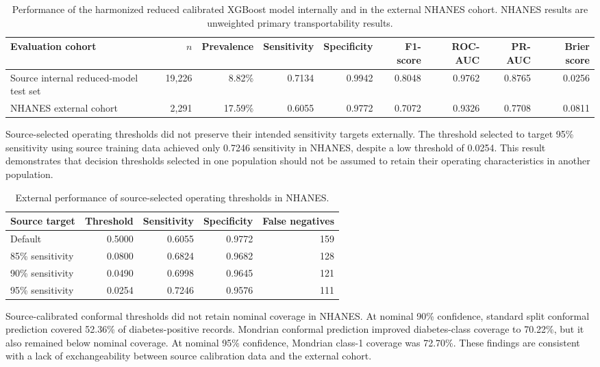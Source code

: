 \documentclass{ieeeaccess}
\begin{document}
\begin{table}[t]
\caption{Performance of the harmonized reduced calibrated XGBoost model internally and in the external NHANES cohort. NHANES results are unweighted primary transportability results.}
\label{tab:externalperformance}
\centering
\begin{tabular}{lrrrrrrrr}
\toprule
Evaluation cohort & $n$ & Prevalence & Sensitivity & Specificity & F1-score & ROC-AUC & PR-AUC & Brier score \\
\midrule
Source internal reduced-model test set & 19,226 & 8.82\% & 0.7134 & 0.9942 & 0.8048 & 0.9762 & 0.8765 & 0.0256 \\
NHANES external cohort & 2,291 & 17.59\% & 0.6055 & 0.9772 & 0.7072 & 0.9326 & 0.7708 & 0.0811 \\
\bottomrule
\end{tabular}
\end{table}

Source-selected operating thresholds did not preserve their intended sensitivity targets externally. The threshold selected to target 95\% sensitivity using source training data achieved only 0.7246 sensitivity in NHANES, despite a low threshold of 0.0254. This result demonstrates that decision thresholds selected in one population should not be assumed to retain their operating characteristics in another population.

\begin{table}[t]
\caption{External performance of source-selected operating thresholds in NHANES.}
\label{tab:externalthresholds}
\centering
\begin{tabular}{lrrrr}
\toprule
Source target & Threshold & Sensitivity & Specificity & False negatives \\
\midrule
Default & 0.5000 & 0.6055 & 0.9772 & 159 \\
85\% sensitivity & 0.0800 & 0.6824 & 0.9682 & 128 \\
90\% sensitivity & 0.0490 & 0.6998 & 0.9645 & 121 \\
95\% sensitivity & 0.0254 & 0.7246 & 0.9576 & 111 \\
\bottomrule
\end{tabular}
\end{table}

Source-calibrated conformal thresholds did not retain nominal coverage in NHANES. At nominal 90\% confidence, standard split conformal prediction covered 52.36\% of diabetes-positive records. Mondrian conformal prediction improved diabetes-class coverage to 70.22\%, but it also remained below nominal coverage. At nominal 95\% confidence, Mondrian class-1 coverage was 72.70\%. These findings are consistent with a lack of exchangeability between source calibration data and the external cohort.
\end{document}
